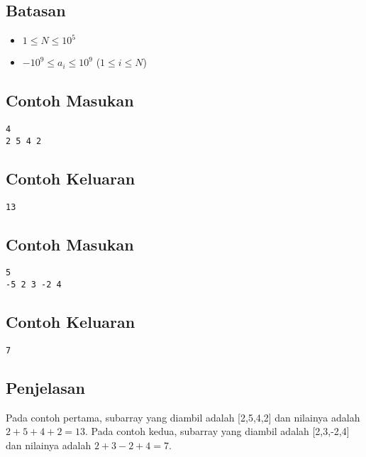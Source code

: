 \documentclass{article}
\begin{document}
\subsection*{Batasan}

\begin{itemize}
    \setlength\itemsep{0pt}
    \item $1 \leq N \leq 10^5$
    \item $-10^9 \leq a_i \leq 10^9$ ($1 \leq i \leq N$)
\end{itemize}

\begin{multicols}{2}
\subsection*{Contoh Masukan}
\begin{lstlisting}
4
2 5 4 2
\end{lstlisting}
\columnbreak
\subsection*{Contoh Keluaran}
\begin{lstlisting}
13
\end{lstlisting}
\vfill
\null
\end{multicols}

\begin{multicols}{2}
\subsection*{Contoh Masukan}
\begin{lstlisting}
5
-5 2 3 -2 4
\end{lstlisting}
\columnbreak
\subsection*{Contoh Keluaran}
\begin{lstlisting}
7
\end{lstlisting}
\vfill
\null
\end{multicols}
\subsection*{Penjelasan}
Pada contoh pertama, subarray yang diambil adalah [2,5,4,2] dan nilainya adalah $2+5+4+2 = 13$.
Pada contoh kedua, subarray yang diambil adalah [2,3,-2,4] dan nilainya adalah $2+3-2+4 = 7$.

\pagebreak
\end{document}

